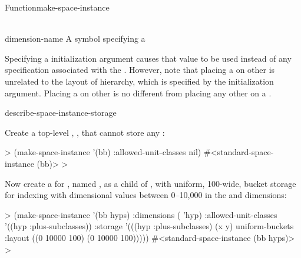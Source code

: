 \documentclass[10pt,twoside,english,pdftex]{article}
\begin{document}
\begin{functiondoc}{Function}{make-space-instance}{
      \\ 
      \\
    \returns{} }
\fnterms
\begin{args}{dimension-name}
 A symbol specifying a  
\end{args}

\fndescription 
%
%
%
%
Specifying a  initialization argument causes
that value to be used instead of any 
specification associated with the .  However, note that
placing a  on other  is unrelated
to the layout of  hierarchy, which is specified
by the  initialization argument.  Placing a
 on other  is no different from
placing any other  on a .

\begin{alsos}{describe-space-instance-storage}
\also[children-of]
\also[dimensions-of]
\also[parent-of]
\end{alsos}

\fnexamples
Create a top-level , ,
that cannot store any :
%
\W\supp
\begin{example}
  > (make-space-instance '(bb) 
       :allowed-unit-classes nil)
  #<standard-space-instance (bb)>
  > 
\end{example}
%
%
%
Now create a  for  ,
named , as a child of , with uniform, 100-wide, bucket
storage for indexing  with dimensional values between 
0--10,000 in the  and  dimensions:
%
\W\supp\notpretop
\begin{example}
  > (make-space-instance '(bb hyps)
       :dimensions ( 'hyp)
       :allowed-unit-classes '((hyp :plus-subclasses))
       :storage '(((hyp :plus-subclasses) (x y) 
                   uniform-buckets :layout ((0 10000 100)
                                            (0 10000 100)))))
  #<standard-space-instance (bb hyps)>
  >
\end{example}


\end{functiondoc}
\end{document}
